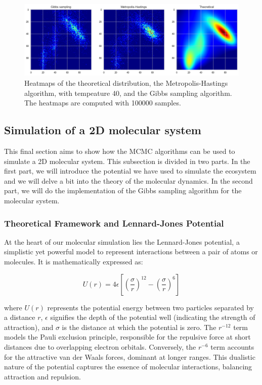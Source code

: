 \documentclass{article}
\begin{document}
\begin{figure}[H]
	\centering
	\includegraphics[width=0.75\linewidth]{./Figures/MCMC/heatmaps.png}
	\caption{Heatmaps of the theoretical distribution, the Metropolis-Hastings algorithm, with tempeature 40, and the Gibbs sampling algorithm. The heatmaps are computed with 100000 samples.}
	\label{fig:heatmaps}
\end{figure}

\subsection{Simulation of a 2D molecular system}

This final section aims to show how the MCMC algorithms can be used to simulate a 2D molecular system. This subsection is divided in two parts. In the first part, we will introduce the potential we have used to simulate the ecosystem and we will delve a bit into the theory of the molecular dynamics. In the second part, we will do the implementation of the Gibbs sampling algorithm for the molecular system.

\subsubsection{Theoretical Framework and Lennard-Jones Potential}

At the heart of our molecular simulation lies the Lennard-Jones potential, a simplistic yet powerful model to represent interactions between a pair of atoms or molecules. It is mathematically expressed as:

\[
	U(r) = 4\epsilon \left[ \left( \frac{\sigma}{r} \right)^{12} - \left( \frac{\sigma}{r} \right)^6 \right]
\]

where \( U(r) \) represents the potential energy between two particles separated by a distance \( r \), \( \epsilon \) signifies the depth of the potential well (indicating the strength of attraction), and \( \sigma \) is the distance at which the potential is zero. The \( r^{-12} \) term models the Pauli exclusion principle, responsible for the repulsive force at short distances due to overlapping electron orbitals. Conversely, the \( r^{-6} \) term accounts for the attractive van der Waals forces, dominant at longer ranges. This dualistic nature of the potential captures the essence of molecular interactions, balancing attraction and repulsion.
\end{document}
